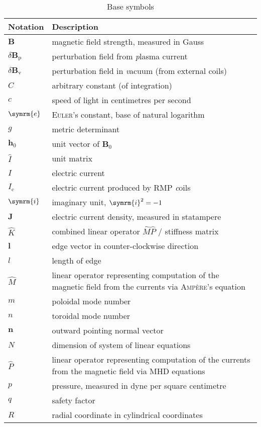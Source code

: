 \documentclass[a4paper, twoside, 10pt, english]{article}
\numberwithin{equation}{section}
\let\vec\symbf
\newcommand*\e{\ensuremath{\symrm{e}}}  %
\newcommand*\im{\ensuremath{\symrm{i}}}  %
\newcommand*\Bvac{\ensuremath{\delta \vec{B}_{\text{v}}}}  %
\newcommand*\Bplas{\ensuremath{\delta \vec{B}_{\text{p}}}}  %
\begin{document}
\begin{longtable}{l >{\RaggedRight}p{}}
  \caption{Base symbols} \\
  \toprule
  \textbf{Notation} & \textbf{Description} \\
  \midrule
  \endhead
  $\vec{B}$ & magnetic field strength, measured in Gauss \\
  $\Bplas$ & perturbation field from \emph{p}lasma current \\
  $\Bvac$ & perturbation field in \emph{v}acuum (from external coils) \\
  $C$ & arbitrary constant (of integration) \\
  $c$ & speed of light in centimetres per second \\
  $\e$ & \textsc{Euler}'s constant, base of natural logarithm \\
  $g$ & metric determinant \\
  $\vec{h}_{0}$ & unit vector of $\vec{B}_{0}$ \\
  $\hat{I}$ & unit matrix \\
  $I$ & electric current \\
  $I_{\text{c}}$ & electric current produced by RMP \emph{c}oils \\
  $\im$ & imaginary unit, $\im^{2} = -1$ \\
  $\vec{J}$ & electric current density, measured in statampere \\
  $\hat{K}$ & combined linear operator $\hat{M} \hat{P}$ / stiffness matrix \\
  $\vec{l}$ & edge vector in counter-clockwise direction \\
  $l$ & length of edge \\
  $\hat{M}$ & linear operator representing computation of the magnetic field from the currents via \textsc{Ampère}'s equation \\
  $m$ & poloidal mode number \\
  $n$ & toroidal mode number \\
  $\vec{n}$ & outward pointing normal vector \\
  $N$ & dimension of system of linear equations \\
  $\hat{P}$ & linear operator representing computation of the currents from the magnetic field via MHD equations \\
  $p$ & pressure, measured in dyne per square centimetre \\
  $q$ & safety factor \\
  $R$ & radial coordinate in cylindrical coordinates \\

\end{longtable}
\end{document}
